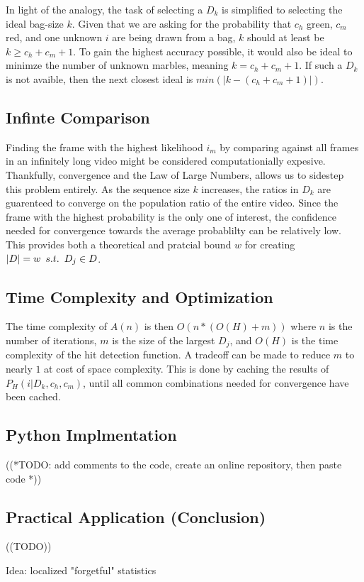 \documentclass{article}
\def\suchThat{\hspace{0.5em} s.t. \hspace{0.5em}}
\newcommand{\br}{ \hfill \break}
\begin{document}
\begin{adjustwidth}{2.5em}{0pt}
        In light of the analogy, the task of selecting a $D_k$ is simplified to selecting the ideal bag-size $k$. Given that we are asking for the probability that $c_h$ green, $c_m$ red, and one unknown $i$ are being drawn from a bag, $k$ should at least be $k \geq c_h + c_m + 1$. To gain the highest accuracy possible, it would also be ideal to minimze the number of unknown marbles, meaning $k = c_h + c_m + 1$. If such a $D_k$ is not avaible, then the next closest ideal is $min(|k - (c_h + c_m + 1)|)$.
    
    \subsection{Infinte Comparison}
        Finding the frame with the highest likelihood $i_m$ by comparing against all frames in an infinitely long video might be considered computationially expesive. Thankfully, convergence and the Law of Large Numbers, allows us to sidestep this problem entirely. As the sequence size $k$ increases, the ratios in $D_k$ are guarenteed to converge on the population ratio of the entire video. Since the frame with the highest probability is the only one of interest, the confidence needed for convergence towards the average probablilty can be relatively low. This provides both a theoretical and pratcial bound $w$ for creating $|D| = w \suchThat D_j \in D$.
        
    \subsection{Time Complexity and Optimization}
        The time complexity of $A(n)$ is then $O(n * (O(H) + m))$ where $n$ is the number of iterations, $m$ is the size of the largest $D_j$, and $O(H)$ is the time complexity of the hit detection function. A tradeoff can be made to reduce $m$ to nearly $1$ at cost of space complexity. This is done by caching the results of $P_H(i | D_k, c_h, c_m)$, until all common combinations needed for convergence have been cached.
    
    \subsection{Python Implmentation}
        ((*TODO: add comments to the code, create an online repository, then paste code *))\br\br
    
    \subsection{Practical Application (Conclusion)}
        ((TODO))\br
        
        Idea: localized "forgetful" statistics
        

%
%
\end{adjustwidth} \br
\end{document}
